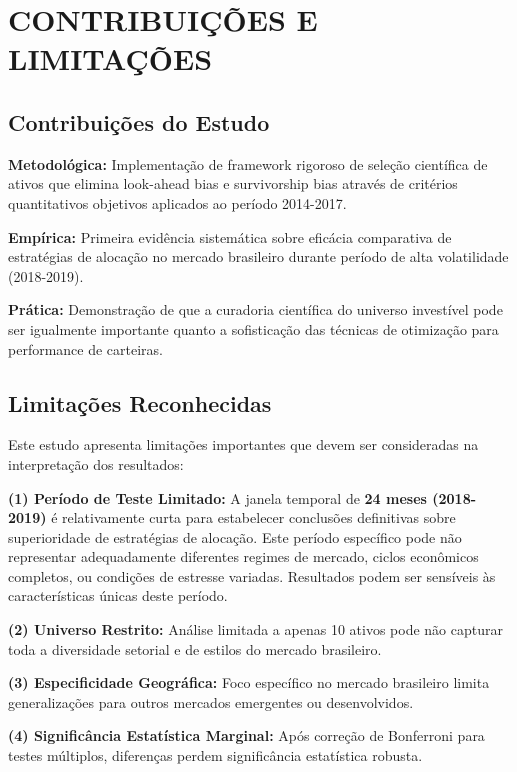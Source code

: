 \section{CONTRIBUIÇÕES E LIMITAÇÕES}

\subsection{Contribuições do Estudo}

\textbf{Metodológica:} Implementação de framework rigoroso de seleção científica de ativos que elimina look-ahead bias e survivorship bias através de critérios quantitativos objetivos aplicados ao período 2014-2017.

\textbf{Empírica:} Primeira evidência sistemática sobre eficácia comparativa de estratégias de alocação no mercado brasileiro durante período de alta volatilidade (2018-2019).

\textbf{Prática:} Demonstração de que a curadoria científica do universo investível pode ser igualmente importante quanto a sofisticação das técnicas de otimização para performance de carteiras.

\subsection{Limitações Reconhecidas}

Este estudo apresenta limitações importantes que devem ser consideradas na interpretação dos resultados: 

\textbf{(1) Período de Teste Limitado:} A janela temporal de \textbf{24 meses (2018-2019)} é relativamente curta para estabelecer conclusões definitivas sobre superioridade de estratégias de alocação. Este período específico pode não representar adequadamente diferentes regimes de mercado, ciclos econômicos completos, ou condições de estresse variadas. Resultados podem ser sensíveis às características únicas deste período.

\textbf{(2) Universo Restrito:} Análise limitada a apenas 10 ativos pode não capturar toda a diversidade setorial e de estilos do mercado brasileiro.

\textbf{(3) Especificidade Geográfica:} Foco específico no mercado brasileiro limita generalizações para outros mercados emergentes ou desenvolvidos.

\textbf{(4) Significância Estatística Marginal:} Após correção de Bonferroni para testes múltiplos, diferenças perdem significância estatística robusta.

